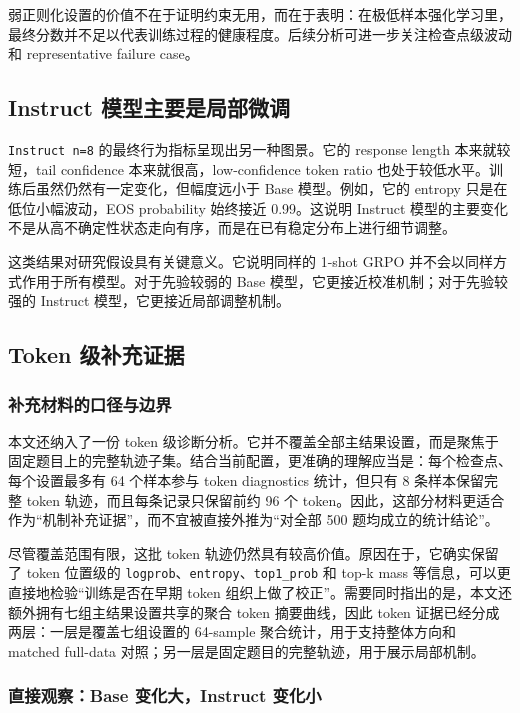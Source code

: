 \documentclass[12pt,a4paper]{ctexart}
\begin{document}
弱正则化设置的价值不在于证明约束无用，而在于表明：在极低样本强化学习里，最终分数并不足以代表训练过程的健康程度。后续分析可进一步关注检查点级波动和 representative failure case。

\subsection{Instruct 模型主要是局部微调}

\texttt{Instruct n=8} 的最终行为指标呈现出另一种图景。它的 response length 本来就较短，tail confidence 本来就很高，low-confidence token ratio 也处于较低水平。训练后虽然仍然有一定变化，但幅度远小于 Base 模型。例如，它的 entropy 只是在低位小幅波动，EOS probability 始终接近 0.99。这说明 Instruct 模型的主要变化不是从高不确定性状态走向有序，而是在已有稳定分布上进行细节调整。

这类结果对研究假设具有关键意义。它说明同样的 1-shot GRPO 并不会以同样方式作用于所有模型。对于先验较弱的 Base 模型，它更接近校准机制；对于先验较强的 Instruct 模型，它更接近局部调整机制。

\subsection{Token 级补充证据}

\subsubsection{补充材料的口径与边界}

本文还纳入了一份 token 级诊断分析。它并不覆盖全部主结果设置，而是聚焦于固定题目上的完整轨迹子集。结合当前配置，更准确的理解应当是：每个检查点、每个设置最多有 64 个样本参与 token diagnostics 统计，但只有 8 条样本保留完整 token 轨迹，而且每条记录只保留前约 96 个 token。因此，这部分材料更适合作为“机制补充证据”，而不宜被直接外推为“对全部 500 题均成立的统计结论”。

尽管覆盖范围有限，这批 token 轨迹仍然具有较高价值。原因在于，它确实保留了 token 位置级的 \texttt{logprob}、\texttt{entropy}、\texttt{top1\_prob} 和 top-k mass 等信息，可以更直接地检验“训练是否在早期 token 组织上做了校正”。需要同时指出的是，本文还额外拥有七组主结果设置共享的聚合 token 摘要曲线，因此 token 证据已经分成两层：一层是覆盖七组设置的 64-sample 聚合统计，用于支持整体方向和 matched full-data 对照；另一层是固定题目的完整轨迹，用于展示局部机制。

\subsubsection{直接观察：Base 变化大，Instruct 变化小}
\end{document}
